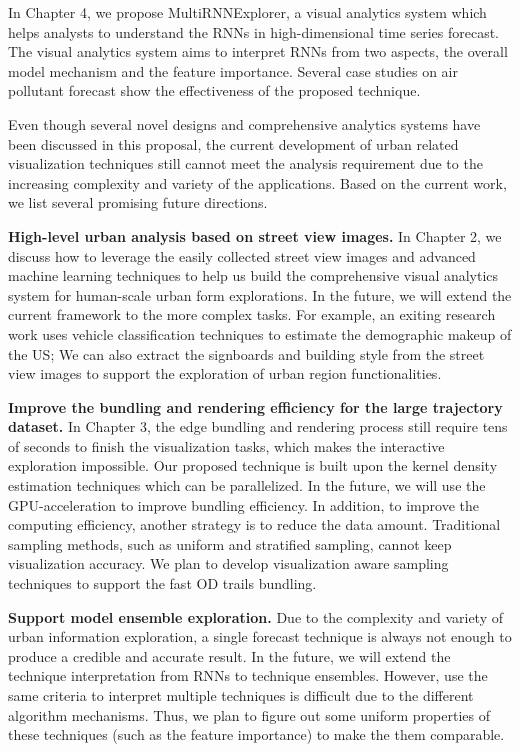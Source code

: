 In Chapter 4, we propose MultiRNNExplorer, a visual analytics system which helps analysts to understand the RNNs in high-dimensional time series forecast. The visual analytics system aims to interpret RNNs from two aspects, the overall model mechanism and the feature importance. Several case studies on air pollutant forecast show the effectiveness of the proposed technique.

Even though several novel designs and comprehensive analytics systems have been discussed in this proposal, the current development of urban related visualization techniques still cannot meet the analysis requirement due to the increasing complexity and variety of the applications. Based on the current work, we list several promising future directions.

\textbf{High-level urban analysis based on street view images.} In Chapter 2, we discuss how to leverage the easily collected street view images and advanced machine learning techniques to help us build the comprehensive visual analytics system for human-scale urban form explorations. In the future, we will extend the current framework to the more complex tasks. For example, an exiting research work uses vehicle classification techniques to estimate the demographic makeup of the US; We can also extract the signboards and building style from the street view images to support the exploration of urban region  functionalities.  

\textbf{Improve the bundling and rendering efficiency for the large trajectory dataset.} In Chapter 3, the edge bundling and rendering process still require tens of seconds to finish the visualization tasks, which makes the interactive exploration impossible. Our proposed technique is built upon the kernel density estimation techniques which can be parallelized. In the future, we will use the GPU-acceleration to improve bundling efficiency. In addition, to improve the computing efficiency, another strategy is to reduce the data amount. Traditional sampling methods, such as uniform and stratified sampling, cannot keep visualization accuracy. We plan to develop visualization aware sampling techniques to support the fast OD trails bundling. 

\textbf{Support model ensemble exploration.} Due to the complexity and variety of urban information exploration, a single forecast technique is always not enough to produce a credible and accurate result. In the future, we will extend the technique interpretation from RNNs to technique ensembles. However, use the same criteria to interpret multiple techniques is difficult due to the different algorithm mechanisms. Thus, we plan to figure out some uniform properties of these techniques (such as the feature importance) to make the them comparable. 